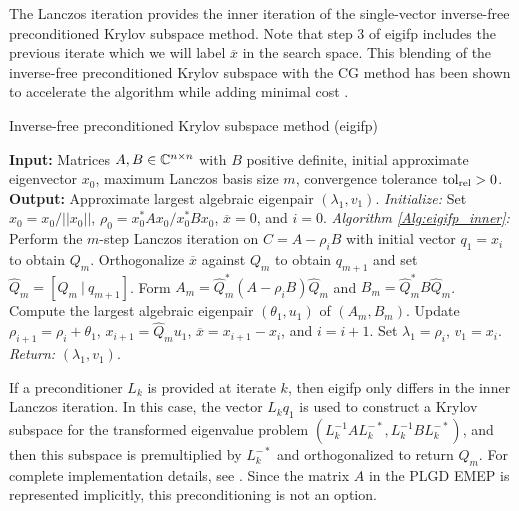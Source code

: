 \begin{enumerate}
\begin{algorithm}[H]
\end{algorithm}

The Lanczos iteration provides the inner iteration of the single-vector inverse-free preconditioned Krylov subspace method.  Note that step 3 of eigifp includes the previous iterate which we will label $\overline{x}$ in the search space.  This blending of the inverse-free preconditioned Krylov subspace with the CG method has been shown to accelerate the algorithm while adding minimal cost \cite{money2005algorithm}.



\begin{algorithm}[H]
\caption{Inverse-free preconditioned Krylov subspace method (eigifp)}	\label{Alg:eigifp}

\begin{algorithmic}[1]
	\Statex 	\textbf{Input:} Matrices $A, B \in {\mathbb C}^{n \times n}$ with $B$ positive definite, initial approximate eigenvector $x_0$, maximum Lanczos basis size $m$,  convergence tolerance $\textnormal{tol}_\textnormal{rel} > 0$.
	\Statex 	\textbf{Output:} Approximate largest algebraic eigenpair $(\lambda_1, v_1)$.
	\State		\textit{Initialize:} Set $x_0 = x_0/||x_0||$, $\rho_0 = x_0^*A x_0 / x_0^* B x_0$, $\overline{x} = 0$, and $i = 0$.
		\State		\textit{Algorithm \ref{Alg:eigifp_inner}:} Perform the $m$-step Lanczos iteration on $C  = A - \rho_i B$ with initial vector $q_1 = x_i$ to obtain $Q_m$.
		\State 		Orthogonalize $\overline{x}$ against $Q_m$ to obtain $q_{m+1}$ and set $\widehat{Q}_m = [Q_m \ | \ q_{m+1}]$.
		\State		Form $A_m = \widehat{Q}_m^*(A-\rho_i B)\widehat{Q}_m$ and $B_m = \widehat{Q}_m^*B \widehat{Q}_m$.
		\State		Compute the largest algebraic eigenpair $(\theta_1, u_1)$ of $(A_m, B_m)$.
		\State		Update $\rho_{i+1} = \rho_i + \theta_1$, $x_{i+1} = \widehat{Q}_m u_1$, $\overline{x} = x_{i+1} - x_i$, and $i = i + 1$.
	\EndWhile
	\State		Set $\lambda_1 = \rho_i$, $v_1 = x_i$.
	\State		\textit{Return:} $(\lambda_1, v_1)$.
\end{algorithmic}

\end{algorithm}

If a preconditioner $L_k$ is provided at iterate $k$, then eigifp only differs in the inner Lanczos iteration.  In this case, the vector $L_kq_1$ is used to construct a Krylov subspace for the transformed eigenvalue problem $(L_k^{-1}AL_k^{-*}, L_k^{-1}BL_k^{-*})$, and then this subspace is premultiplied by $L_k^{-*}$ and orthogonalized to return $Q_m$.  For complete  implementation details, see \cite[Section 5]{golub2002inverse}.  Since the matrix $A$ in the PLGD EMEP is represented implicitly, this preconditioning is not an option.


\end{enumerate}

